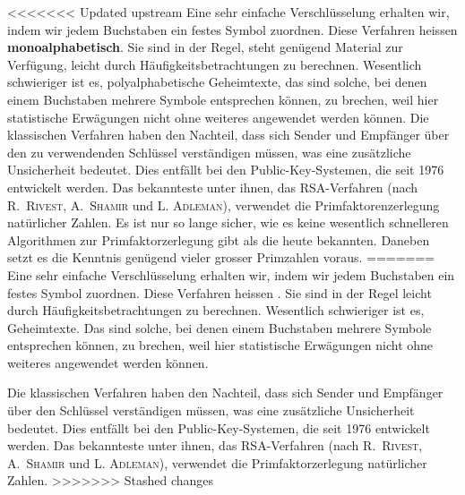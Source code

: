 \documentclass[%
<<<<<<< Updated upstream
11pt,%
twoside,%
titlepage,%
german,%
headsepline%
]{scrartcl}
\begin{document}
<<<<<<< Updated upstream
Eine sehr einfache Verschlüsselung erhalten wir, indem wir jedem Buchstaben ein festes Symbol zuordnen. Diese Verfahren heissen \textbf{monoalphabetisch}. Sie sind in der Regel, steht genügend Material zur Verfügung, leicht durch Häufigkeitsbetrachtungen zu berechnen. Wesentlich schwieriger ist es, polyalphabetische Geheimtexte, das sind solche, bei denen einem Buchstaben mehrere Symbole entsprechen k\"onnen, zu brechen, weil hier statistische Erwägungen nicht ohne weiteres angewendet werden k\"onnen. Die klassischen Verfahren haben den Nachteil, dass sich Sender und Empfänger über den zu verwendenden Schlüssel verständigen müssen, was eine zusätzliche Unsicherheit bedeutet. Dies entfällt bei den Public-Key-Systemen, die seit 1976 entwickelt werden. Das bekannteste unter ihnen, das RSA-Verfahren (nach \textsc{R.~Rivest, A.~Shamir} und \textsc{L. Adleman}), verwendet die Primfaktorenzerlegung natürlicher Zahlen. Es ist nur so lange sicher, wie es keine wesentlich schnelleren Algorithmen zur Primfaktorzerlegung gibt als die heute bekannten. Daneben setzt es die Kenntnis genügend vieler grosser Primzahlen voraus.
=======
Eine sehr einfache Verschlüsselung erhalten wir, indem wir jedem Buchstaben ein festes Symbol zuordnen. Diese Verfahren heissen . Sie sind in der Regel leicht durch Häufigkeitsbetrachtungen zu berechnen. Wesentlich schwieriger ist es,  Geheimtexte. Das sind solche, bei denen einem Buchstaben mehrere Symbole entsprechen können, zu brechen, weil hier statistische Erwägungen nicht ohne weiteres angewendet werden können.

Die klassischen Verfahren haben den Nachteil, dass sich Sender und Empfänger über den Schlüssel verständigen müssen, was eine zusätzliche Unsicherheit bedeutet. Dies entfällt bei den Public-Key-Systemen, die seit 1976 entwickelt werden. Das bekannteste unter ihnen, das RSA-Verfahren (nach \textsc{R.~Rivest, A.~Shamir} und \textsc{L. Adleman}), verwendet die Primfaktorzerlegung natürlicher Zahlen.
>>>>>>> Stashed changes
\end{document}
